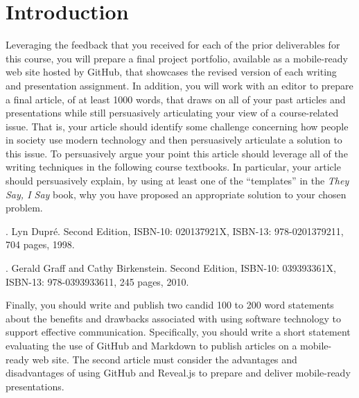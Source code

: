 

\usepackage[compact]{titlesec}




\vspace*{-.2in}
\section*{Introduction}

Leveraging the feedback that you received for each of the prior deliverables for this course, you will prepare a final
project portfolio, available as a mobile-ready web site hosted by GitHub, that showcases the revised version of each
writing and presentation assignment. In addition, you will work with an editor to prepare a final article, of at least
1000 words, that draws on all of your past articles and presentations while still persuasively articulating your view of
a course-related issue. That is, your article should identify some challenge concerning how people in society use modern
technology and then persuasively articulate a solution to this issue. To persuasively argue your point this article
should leverage all of the writing techniques in the following course textbooks. In particular, your article should
persuasively explain, by using at least one of the ``templates'' in the {\em They Say, I Say} book, why you have
proposed an appropriate solution to your chosen problem.

. Lyn Dupr\'e. Second Edition, ISBN-10: 020137921X,
ISBN-13: 978-0201379211, 704 pages, 1998.

. Gerald Graff and Cathy Birkenstein. Second Edition,
ISBN-10: 039393361X, ISBN-13: 978-0393933611, 245 pages, 2010.

Finally, you should write and publish two candid 100 to 200 word statements about the benefits and drawbacks associated
with using software technology to support effective communication. Specifically, you should write a short statement
evaluating the use of GitHub and Markdown to publish articles on a mobile-ready web site. The second article must
consider the advantages and disadvantages of using GitHub and Reveal.js to prepare and deliver mobile-ready
presentations.

